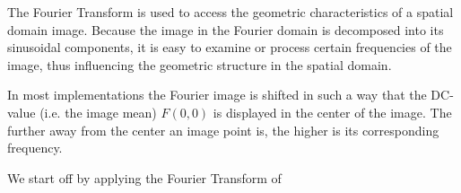 \documentclass[12pt,a4paper]{article}
\begin{document}
The Fourier Transform is used to access the geometric characteristics of a spatial domain image. Because the image in the Fourier domain is decomposed into its sinusoidal components, it is easy to examine or process certain frequencies of the image, thus influencing the geometric structure in the spatial domain.

In most implementations the Fourier image is shifted in such a way that the DC-value (i.e. the image mean) $F(0,0)$ is displayed in the center of the image. The further away from the center an image point is, the higher is its corresponding frequency.

We start off by applying the Fourier Transform of







\end{document}
